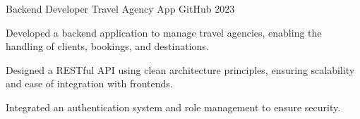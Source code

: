 \begin{cventries}
{\begin{cvitems}
      \end{cvitems}
    }
    \cventry
    {Backend Developer}
    {Travel Agency App}
    {GitHub}
    {2023}
    {
      \begin{cvitems}
        \item {Developed a backend application to manage travel agencies, enabling the handling of clients, bookings, and destinations.}
        \item {Designed a RESTful API using clean architecture principles, ensuring scalability and ease of integration with frontends.}
        \item {Integrated an authentication system and role management to ensure security.}
      \end{cvitems}
    }
\end{cventries}
